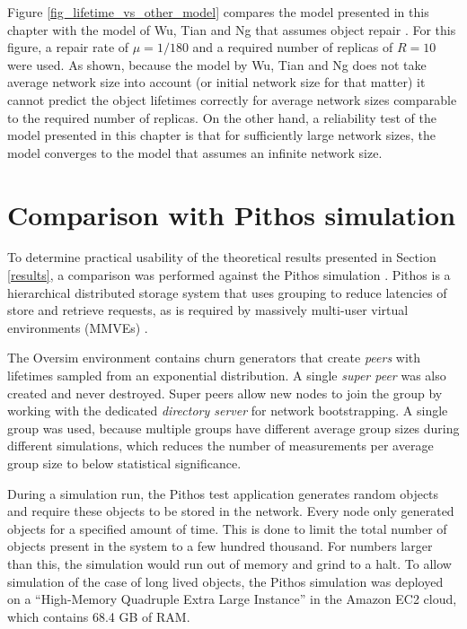 Figure \ref{fig_lifetime_vs_other_model} compares the model presented in this chapter with the model of Wu, Tian and Ng that assumes object repair \cite{replication_article}. For this figure, a repair rate of $\mu = 1/180$ and a required number of replicas of $R = 10$ were used. As shown, because the model by Wu, Tian and Ng does not take average network size into account (or initial network size for that matter) it cannot predict the object lifetimes correctly for average network sizes comparable to the required number of replicas. On the other hand, a reliability test of the model presented in this chapter is that for sufficiently large network sizes, the model converges to the model that assumes an infinite network size.

\section{Comparison with Pithos simulation}
\label{simulation}

To determine practical usability of the theoretical results presented in Section \ref{results}, a comparison was performed against the Pithos simulation \cite{Pithos_mmve_2011}. Pithos is a hierarchical distributed storage system that uses grouping to reduce latencies of store and retrieve requests, as is required by massively multi-user virtual environments (MMVEs) \cite{gilmore_p2p_mmog_state_persistency}.

The Oversim environment contains churn generators that create \emph{peers} with lifetimes sampled from an exponential distribution. A single \emph{super peer} was also created and never destroyed. Super peers allow new nodes to join the group by working with the dedicated \emph{directory server} for network bootstrapping. A single group was used, because multiple groups have different average group sizes during different simulations, which reduces the number of measurements per average group size to below statistical significance.

During a simulation run, the Pithos test application generates random objects and require these objects to be stored in the network. Every node only generated objects for a specified amount of time. This is done to limit the total number of objects present in the system to a few hundred thousand. For numbers larger than this, the simulation would run out of memory and grind to a halt. To allow simulation of the case of long lived objects, the Pithos simulation was deployed on a ``High-Memory Quadruple Extra Large Instance'' in the Amazon EC2 cloud, which contains 68.4 GB of RAM.

